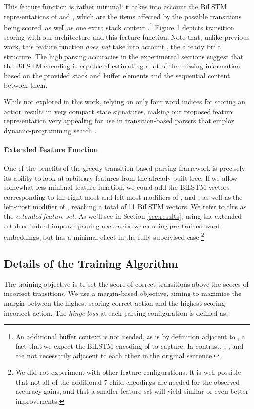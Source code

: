 \documentclass[11pt]{article}
\begin{document}
This feature function is rather minimal: it takes into account the BiLSTM
representations of  and
, which are the items affected by the possible transitions being scored, as
well as one extra
stack context .\footnote{An additional buffer context is not needed, as
 is by definition adjacent to , a fact that we expect the BiLSTM
encoding of  to capture.  In contrast, , ,  and  are
not necessarily adjacent to each other in the original sentence.}
Figure 1 depicts transition scoring with our architecture and this feature function. Note that, unlike previous work, this feature function \emph{does not} take into account , the already built
structure.  The high parsing accuracies in the experimental sections suggest
that the \mbox{BiLSTM} encoding is capable of estimating a lot of the missing
information based on the provided stack and buffer elements and the sequential
content between them.

While not explored in this work, relying on only four word indices for scoring
an action results in
very compact state signatures, making our proposed feature representation 
very appealing for use in transition-based parsers that employ dynamic-programming search \cite{huang-sagae:2010:ACL,kuhlmann2011}.

\paragraph{Extended Feature Function}
One of the benefits of the greedy transition-based parsing framework is
precisely its ability to look at arbitrary features from the already built tree.
If we allow somewhat less minimal feature function, we could add the \mbox{BiLSTM}
vectors corresponding to the right-most and left-most modifiers of , 
and , as well as the left-most modifier of ,
reaching a total of 11 \mbox{BiLSTM} vectors. We
refer to this as the \emph{extended feature set}. As we'll see in Section
\ref{sec:results}, using the extended set does indeed improve parsing accuracies when using
pre-trained word embeddings, but has a minimal effect in the fully-supervised
case.\footnote{We did not experiment with other feature configurations. It is well possible that not all of the additional 7 child encodings are needed for the observed accuracy gains, and that a smaller feature set will yield similar or even better improvements.}

\subsection{Details of the Training Algorithm}
The training objective is to set the score of correct transitions above the
scores of incorrect transitions.
We use a margin-based objective, aiming to
maximize the margin between the highest scoring correct action and the highest
scoring incorrect action. The \emph{hinge loss} at each parsing configuration
 is defined as:
    \vspace{-1em}
\begin{center}


\end{center}
\end{document}
